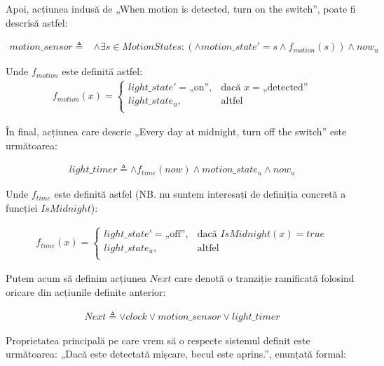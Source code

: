 Apoi, acțiunea indusă de „When motion is detected, turn on the switch”, poate fi descrisă astfel:

\begin{align*}
    motion\_sensor \triangleq &\wedge \exists s \in MotionStates : (
        \wedge motion\_state' = s \wedge f_{motion}(s)
    ) \wedge now_u
\end{align*}

Unde $f_{motion}$ este definită astfel:
\begin{gather*}
    f_{motion}(x) = \left\{
        \begin{array}{ll}
              light\_state' = \text{„on”}, & \text{dacă } x = \text{„detected”} \\
              light\_state_u, & \text{altfel} \\
        \end{array} 
        \right. 
\end{gather*}

În final, acțiunea care descrie „Every day at midnight, turn off the switch” este următoarea:

\begin{align*}
    light\_timer \triangleq \wedge f_{time}(now) \wedge motion\_state_u \wedge now_u
\end{align*}

Unde $f_{time}$ este definită astfel (NB. nu suntem interesați de definiția concretă a funcției $IsMidnight$):

\begin{align*}
    f_{time}(x) = \left\{
        \begin{array}{ll}
              light\_state' = \text{„off”}, & \text{dacă } IsMidnight(x) = true \\
              light\_state_u, & \text{altfel} \\
        \end{array} 
        \right. 
\end{align*}

Putem acum să definim acțiunea $Next$ care denotă o tranziție ramificată folosind oricare din acțiunile definite anterior:

\begin{align*}
    Next \triangleq \vee clock \vee motion\_sensor \vee light\_timer
\end{align*}

Proprietatea principală pe care vrem să o respecte sistemul definit este următoarea: „Dacă este detectată mișcare, becul este aprins.”, enunțată formal:

